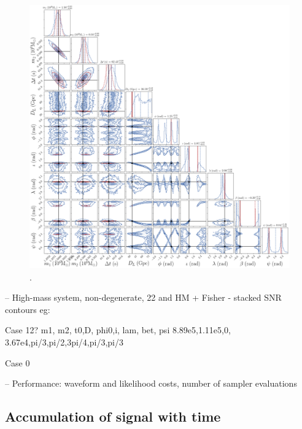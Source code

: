 \documentclass[aps,showpacs,twocolumn,prd,superscriptaddress,nofootinbib]{revtex4-1}
\begin{document}
\begin{figure}
  \centering
  \includegraphics[width=.98\linewidth]{../plots/corner_smbh_case9_ptmcmc_22_hm.png}
  \caption{.}
  \label{fig:PEsmbh22hmCase0}
\end{figure}

-- High-mass system, non-degenerate, 22 and HM + Fisher - stacked SNR contours
eg:

Case 12?
m1,    m2,    t0,D,     phi0,i,   lam,  bet, psi
8.89e5,1.11e5,0, 3.67e4,pi/3,pi/2,3pi/4,pi/3,pi/3

Case 0

-- Performance: waveform and likelihood costs, number of sampler evaluations


\subsection{Accumulation of signal with time}
\label{sec:SMBHPEacctime}
\end{document}
